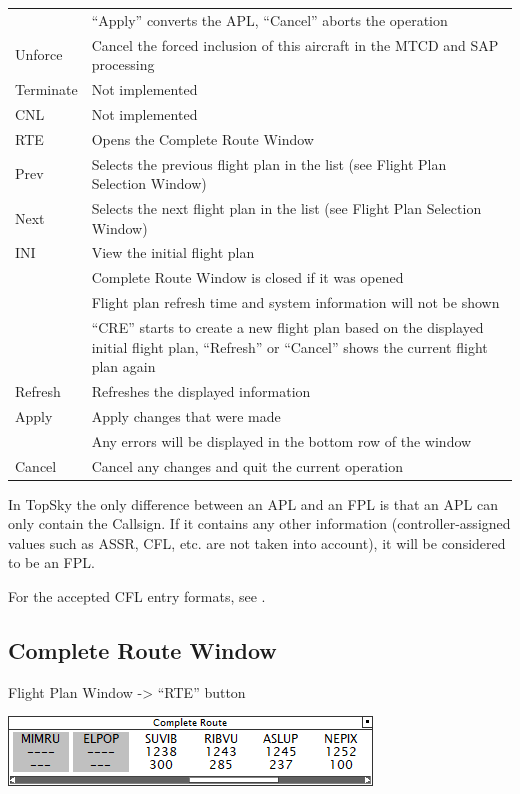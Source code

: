 \documentclass[11pt,a4paper,oldfontcommands]{memoir}
\begin{document}
\begin{tabular}{l l}
                & “Apply” converts the APL, “Cancel” aborts the operation\\
    Unforce     & Cancel the forced inclusion of this aircraft in the MTCD and SAP processing\\
    Terminate   & Not implemented\\
    CNL         & Not implemented\\
    RTE         & Opens the Complete Route Window\\
    Prev        & Selects the previous flight plan in the list (see Flight Plan Selection Window)\\
    Next        & Selects the next flight plan in the list (see Flight Plan Selection Window)\\
    INI         & View the initial flight plan\\
                & Complete Route Window is closed if it was opened\\
                & Flight plan refresh time and system information will not be shown\\
                & “CRE” starts to create a new flight plan based on the displayed initial flight plan, “Refresh” or “Cancel” shows the current flight plan again\\
    Refresh     & Refreshes the displayed information\\
    Apply       & Apply changes that were made\\
                & Any errors will be displayed in the bottom row of the window\\
    Cancel      & Cancel any changes and quit the current operation\\
\end{tabular}

In TopSky the only difference between an APL and an FPL is that an APL can only contain the Callsign. If it contains any other information (controller-assigned values such as ASSR, CFL, etc. are not taken into account), it will be considered to be an FPL.

For the accepted CFL entry formats, see \textit{}.

\subsection{Complete Route Window}
\label{win:crw}

Flight Plan Window -> “RTE” button

\includegraphics{img/route.png}
\end{document}
